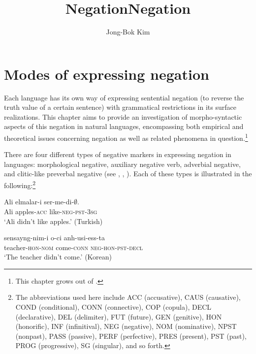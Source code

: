 \documentclass[output=paper
                ,modfonts
		,nonflat
	        ,collection
	        ,collectionchapter
	        ,collectiontoclongg
 	        ,biblatex  
                ,babelshorthands
                ,newtxmath
                ,draftmode
                ,colorlinks, citecolor=brown 
]{./langsci/langscibook}
\author{Jong-Bok Kim\affiliation{Kyung Hee University, Seoul}}
\title{Negation}
\title{Negation}
\begin{document}
\maketitle

{

\section{Modes of expressing negation}
Each language has its own way of expressing
sentential negation (to reverse the truth value of a certain sentence)
with grammatical restrictions in its surface realizations.
This chapter aims to provide an investigation of morpho-syntactic aspects
of this negation in natural languages, encompassing both empirical and
theoretical issues  concerning negation as well as related phenomena
in question.\footnote{This chapter grows out of \citep{Kim:00,18}.}


There are four different types of negative markers
in expressing negation in languages: morphological negative,
auxiliary negative verb, adverbial negative, and clitic-like
 preverbal negative (see \citet{Dahl:79}, \citet{Payne:85}, \citet{Dryer:05}).
Each of these types is illustrated in the following:\footnote{The abbreviations
used here include ACC (accusative), CAUS (causative), COND (conditional), CONN (connective), COP (copula),  DECL (declarative), DEL (delimiter), FUT (future), GEN (genitive), HON (honorific), INF (infinitival), NEG (negative), NOM (nominative), NPST (nonpast), PASS (passive), PERF (perfective), PRES (present), PST (past),   PROG (progressive),  SG (singular), and so forth.}

\eal
\ex\label{1a}
\gll Ali  elmalar-i  ser-me-di-$\emptyset$. \\
Ali apples-\textsc{acc}  like-\textsc{neg}-\textsc{pst}-\textsc{3sg} \\
\glt `Ali didn't like apples.' (Turkish)

\ex\label{1b}
\gll sensayng-nim-i o-ci anh-usi-ess-ta \\
teacher-\textsc{hon}-\textsc{nom} come-\textsc{conn} \textsc{neg}-\textsc{hon}-\textsc{pst}-\textsc{decl} \\
\glt `The teacher didn't come.'  (Korean)

}
\end{document}
